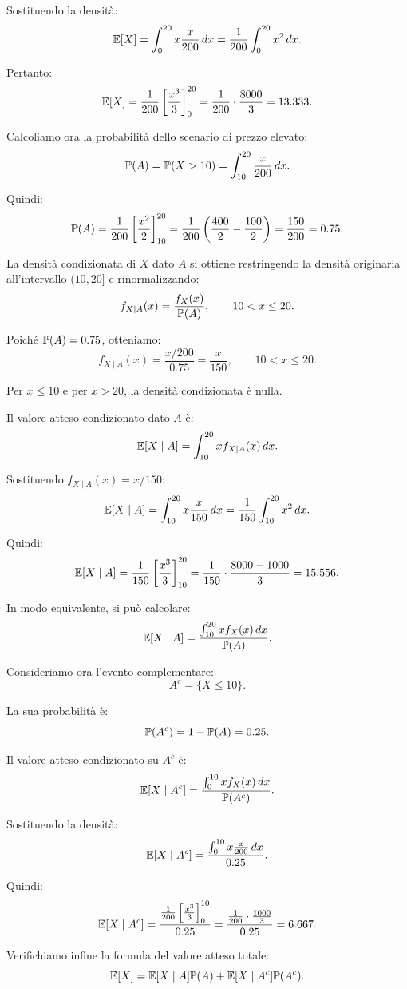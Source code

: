 Sostituendo la densit\`{a}:
\[
\mathbb{E}[X]
=
\int_{0}^{20}
x\frac{x}{200}\,dx
=
\frac{1}{200}
\int_{0}^{20}
x^2\,dx.
\]

Pertanto:
\[
\mathbb{E}[X]
=
\frac{1}{200}
\left[
\frac{x^3}{3}
\right]_{0}^{20}
=
\frac{1}{200}\cdot\frac{8000}{3}
=
13.333.
\]

Calcoliamo ora la probabilit\`{a} dello scenario di prezzo elevato:
\[
\mathbb{P}(A)
=
\mathbb{P}(X>10)
=
\int_{10}^{20}
\frac{x}{200}\,dx.
\]

Quindi:
\[
\mathbb{P}(A)
=
\frac{1}{200}
\left[
\frac{x^2}{2}
\right]_{10}^{20}
=
\frac{1}{200}
\left(
\frac{400}{2}
-
\frac{100}{2}
\right)
=
\frac{150}{200}
=
0.75.
\]

La densit\`{a} condizionata di $X$ dato $A$ si ottiene restringendo la densit\`{a}
originaria all'intervallo $(10,20]$ e rinormalizzando:
\[
f_{X\mid A}(x)
=
\frac{f_X(x)}{\mathbb{P}(A)},
\qquad
10<x\leq 20.
\]

Poich\'{e} $\mathbb{P}(A)=0.75$, otteniamo:
\[
f_{X\mid A}(x)
=
\frac{x/200}{0.75}
=
\frac{x}{150},
\qquad
10<x\leq 20.
\]

Per $x\leq 10$ e per $x>20$, la densit\`{a} condizionata \`{e} nulla.

Il valore atteso condizionato dato $A$ \`{e}:
\[
\mathbb{E}[X\mid A]
=
\int_{10}^{20}
x f_{X\mid A}(x)\,dx.
\]

Sostituendo $f_{X\mid A}(x)=x/150$:
\[
\mathbb{E}[X\mid A]
=
\int_{10}^{20}
x\frac{x}{150}\,dx
=
\frac{1}{150}
\int_{10}^{20}
x^2\,dx.
\]

Quindi:
\[
\mathbb{E}[X\mid A]
=
\frac{1}{150}
\left[
\frac{x^3}{3}
\right]_{10}^{20}
=
\frac{1}{150}
\cdot
\frac{8000-1000}{3}
=
15.556.
\]

In modo equivalente, si pu\`{o} calcolare:
\[
\mathbb{E}[X\mid A]
=
\frac{
\int_{10}^{20}x f_X(x)\,dx
}
{\mathbb{P}(A)}.
\]

Consideriamo ora l'evento complementare:
\[
A^c=\{X\leq 10\}.
\]

La sua probabilit\`{a} \`{e}:
\[
\mathbb{P}(A^c)=1-\mathbb{P}(A)=0.25.
\]

Il valore atteso condizionato su $A^c$ \`{e}:
\[
\mathbb{E}[X\mid A^c]
=
\frac{
\int_{0}^{10}x f_X(x)\,dx
}
{\mathbb{P}(A^c)}.
\]

Sostituendo la densit\`{a}:
\[
\mathbb{E}[X\mid A^c]
=
\frac{
\int_{0}^{10}x\frac{x}{200}\,dx
}
{0.25}.
\]

Quindi:
\[
\mathbb{E}[X\mid A^c]
=
\frac{
\frac{1}{200}
\left[
\frac{x^3}{3}
\right]_{0}^{10}
}
{0.25}
=
\frac{
\frac{1}{200}\cdot\frac{1000}{3}
}
{0.25}
=
6.667.
\]

Verifichiamo infine la formula del valore atteso totale:
\[
\mathbb{E}[X]
=
\mathbb{E}[X\mid A]\mathbb{P}(A)
+
\mathbb{E}[X\mid A^c]\mathbb{P}(A^c).
\]

